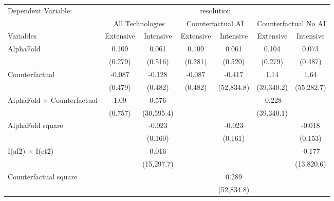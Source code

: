 \begingroup
\centering
\begin{tabular}{lcccccc}
   \tabularnewline \midrule \midrule
   Dependent Variable: & \multicolumn{6}{c}{resolution}\\
 & \multicolumn{2}{c}{All Technologies} & \multicolumn{2}{c}{Counterfactual AI} & \multicolumn{2}{c}{Counterfactual No AI} \\
\cmidrule(lr){1-1}\cmidrule(lr){2-3} \cmidrule(lr){4-5} \cmidrule(lr){6-7}
Variables & \multicolumn{1}{c}{Extensive} & \multicolumn{1}{c}{Intensive} & \multicolumn{1}{c}{Extensive} & \multicolumn{1}{c}{Intensive} & \multicolumn{1}{c}{Extensive} & \multicolumn{1}{c}{Intensive} \\
\cmidrule(lr){1-1}\cmidrule(lr){2-2} \cmidrule(lr){3-3} \cmidrule(lr){4-4} \cmidrule(lr){5-5} \cmidrule(lr){6-6} \cmidrule(lr){7-7}
   AlphaFold                          & 0.109   & 0.061      & 0.109   & 0.061      & 0.104      & 0.073\\   
                                      & (0.279) & (0.516)    & (0.281) & (0.520)    & (0.279)    & (0.487)\\   
   Counterfactual                     & -0.087  & -0.128     & -0.087  & -0.417     & 1.14       & 1.64\\   
                                      & (0.479) & (0.482)    & (0.482) & (52,834.8) & (39,340.2) & (55,282.7)\\   
   AlphaFold $\times$ Counterfactual  & 1.09    & 0.576      &         &            & -0.228     &   \\   
                                      & (0.757) & (30,595.4) &         &            & (39,340.1) &   \\   
   AlphaFold square                   &         & -0.023     &         & -0.023     &            & -0.018\\   
                                      &         & (0.160)    &         & (0.161)    &            & (0.153)\\   
   I(af\^2) $\times$ I(ct\^2)         &         & 0.016      &         &            &            & -0.177\\   
                                      &         & (15,297.7) &         &            &            & (13,820.6)\\   
   Counterfactual square              &         &            &         & 0.289      &            &   \\   
                                      &         &            &         & (52,834.8) &            &   \\   

\end{tabular}
